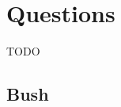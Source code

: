 \begin{code}
\AgdaSpace{}%
\AgdaSpace{}%
\AgdaSpace{}%
\<%
\\
\>[2][@{}l@{\AgdaIndent{0}}]%
\>[4]%
\>[8]\AgdaSymbol{:}\AgdaSpace{}%
\AgdaSpace{}%
\AgdaSpace{}%
\AgdaSpace{}%
\<%
\\
%
\>[4]\AgdaOperator{\AgdaInductiveConstructor{\AgdaUnderscore{},\AgdaUnderscore{}}}\AgdaSpace{}%
\AgdaSymbol{:}\AgdaSpace{}%
\AgdaSpace{}%
\AgdaSpace{}%
\AgdaSpace{}%
\AgdaSpace{}%
\AgdaSpace{}%
\AgdaSpace{}%
\AgdaSpace{}%
\AgdaSpace{}%
\AgdaSpace{}%
\AgdaSpace{}%
\AgdaSpace{}%
\AgdaSymbol{(}\AgdaSpace{}%
\AgdaSpace{}%
\AgdaSymbol{)}\AgdaSpace{}%
\<%
\end{code}

\section{Questions}

TODO

\subsection{Bush}

